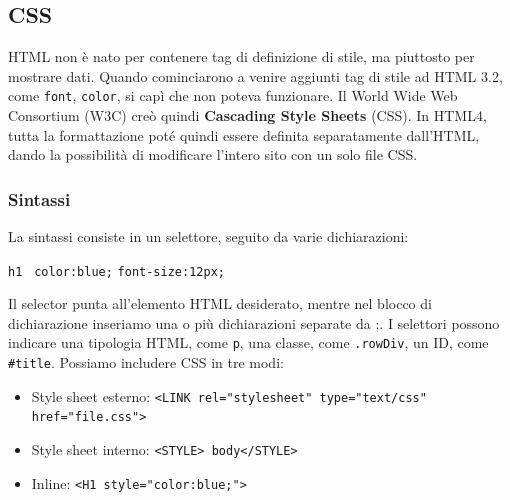 \documentclass[11pt]{article}
\newcommand{\code}[1]{\texttt{#1}}
\begin{document}
\subsection{CSS}
HTML non è nato per contenere tag di definizione di stile, ma piuttosto per mostrare dati. Quando cominciarono a venire aggiunti tag di stile ad HTML 3.2, come \code{font}, \code{color}, si capì che non poteva funzionare. Il World Wide Web Consortium (W3C) creò quindi \textbf{Cascading Style Sheets} (CSS). In HTML4, tutta la formattazione poté quindi essere definita separatamente dall'HTML, dando la possibilità di modificare l'intero sito con un solo file CSS. 
\subsubsection{Sintassi}
La sintassi consiste in un selettore, seguito da varie dichiarazioni:
\begin{center}
    \code{h1 \textbraceleft}
    \code{color:blue;}
    \code{font-size:12px;}
    \code{\textbraceright}
\end{center}
Il selector punta all'elemento HTML desiderato, mentre nel blocco di dichiarazione inseriamo una o più dichiarazioni separate da ;.
I selettori possono indicare una tipologia HTML, come \code{p}, una classe, come \code{.rowDiv}, un ID, come \code{\#title}. Possiamo includere CSS in tre modi:
\begin{itemize}
    \item Style sheet esterno: \code{<LINK rel="stylesheet" type="text/css" href="file.css">}
    \item Style sheet interno: \code{<STYLE> body\textbraceleft\textbraceright</STYLE>}
    \item Inline: \code{<H1 style="color:blue;">}
\end{itemize}
\end{document}
